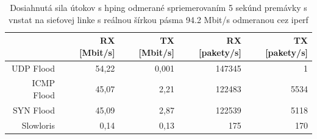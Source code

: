 \documentclass[12pt, a4paper]{article}
\begin{document}
\begin{table}[h!]
\def\arraystretch{1.4}%
\begin{tabular}{|r|r|r|r|r|}
\hline
           & RX {[}Mbit/s{]} & TX {[}Mbit/s{]} & RX {[}pakety/s{]} & TX {[}pakety/s{]} \\ \hline
UDP Flood  & 54,22           & 0,001           & 147345            & 1                 \\ \hline
ICMP Flood & 45,07           & 2,21            & 122483            & 5534              \\ \hline
SYN Flood  & 45,09           & 2,87            & 122539            & 5118              \\ \hline
Slowloris  & 0,14            & 0,13            & 175               & 170               \\ \hline
\end{tabular}
\caption{Dosiahnutá sila útokov s hping odmerané spriemerovaním 5 sekúnd premávky s vnstat na
sieťovej linke s reálnou šírkou pásma 94.2 Mbit/s odmeranou cez iperf}
\label{dos-speeds}
\end{table}
\end{document}
